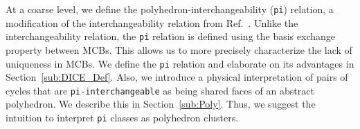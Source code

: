 \documentclass[fleqn,11pt]{article}
\begin{document}
At a coarse level, we define the polyhedron-interchangeability ({\tt pi}) relation, 
a modification of the interchangeability relation from Ref.~\cite{gleissInterchangeability2000}.
Unlike the interchangeability relation, the {\tt pi} relation is defined using the basis exchange property between MCBs.
This allows us to more precisely characterize the lack of uniqueness in MCBs.
We define the {\tt pi} relation and elaborate on its advantages in Section~\ref{sub:DICE_Def}. 
Also, we introduce a physical interpretation of pairs of cycles that are {\tt pi-interchangeable} as being shared faces of an abstract polyhedron. We describe this in Section~\ref{sub:Poly}. Thus, we suggest the intuition to interpret {\tt pi} classes as polyhedron clusters.


\end{document}
